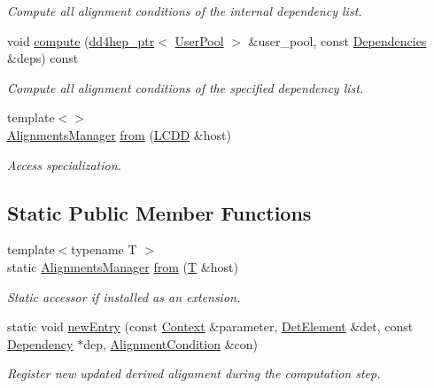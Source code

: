 \begin{DoxyCompactItemize}
\begin{DoxyCompactList}\small\item\em Compute all alignment conditions of the internal dependency list. \end{DoxyCompactList}\item 
void \hyperlink{class_d_d4hep_1_1_alignments_1_1_alignments_manager_ac33445afaa37e1cf8e645701b4ddf0d0}{compute} (\hyperlink{class_d_d4hep_1_1dd4hep__ptr}{dd4hep\+\_\+ptr}$<$ \hyperlink{class_d_d4hep_1_1_conditions_1_1_user_pool}{User\+Pool} $>$ \&user\+\_\+pool, const \hyperlink{class_d_d4hep_1_1_alignments_1_1_alignments_manager_ae8068cb8b252db1243c87eccad69e980}{Dependencies} \&deps) const
\begin{DoxyCompactList}\small\item\em Compute all alignment conditions of the specified dependency list. \end{DoxyCompactList}\item 
{\footnotesize template$<$$>$ }\\\hyperlink{class_d_d4hep_1_1_alignments_1_1_alignments_manager}{Alignments\+Manager} \hyperlink{class_d_d4hep_1_1_alignments_1_1_alignments_manager_a59e0efc65df3f88251b25fe15d07cdb9}{from} (\hyperlink{class_d_d4hep_1_1_geometry_1_1_l_c_d_d}{L\+C\+DD} \&host)
\begin{DoxyCompactList}\small\item\em Access specialization. \end{DoxyCompactList}\end{DoxyCompactItemize}
\subsection*{Static Public Member Functions}
\begin{DoxyCompactItemize}
\item 
{\footnotesize template$<$typename T $>$ }\\static \hyperlink{class_d_d4hep_1_1_alignments_1_1_alignments_manager}{Alignments\+Manager} \hyperlink{class_d_d4hep_1_1_alignments_1_1_alignments_manager_a78dd11bc6f7e7af1bcebca8b1ff8408c}{from} (\hyperlink{class_t}{T} \&host)
\begin{DoxyCompactList}\small\item\em Static accessor if installed as an extension. \end{DoxyCompactList}\item 
static void \hyperlink{class_d_d4hep_1_1_alignments_1_1_alignments_manager_a193ada1fb36be0e72fa92f83a4610c80}{new\+Entry} (const \hyperlink{class_d_d4hep_1_1_alignments_1_1_alignments_manager_a6756d14a9af79dbc28296c765f6bf581}{Context} \&parameter, \hyperlink{class_d_d4hep_1_1_geometry_1_1_det_element}{Det\+Element} \&det, const \hyperlink{class_d_d4hep_1_1_alignments_1_1_alignments_manager_a62dad65e1472f8939e5a83f859e96d26}{Dependency} $\ast$dep, \hyperlink{class_d_d4hep_1_1_alignments_1_1_alignment_condition}{Alignment\+Condition} \&con)
\begin{DoxyCompactList}\small\item\em Register new updated derived alignment during the computation step. \end{DoxyCompactList}\end{DoxyCompactItemize}
